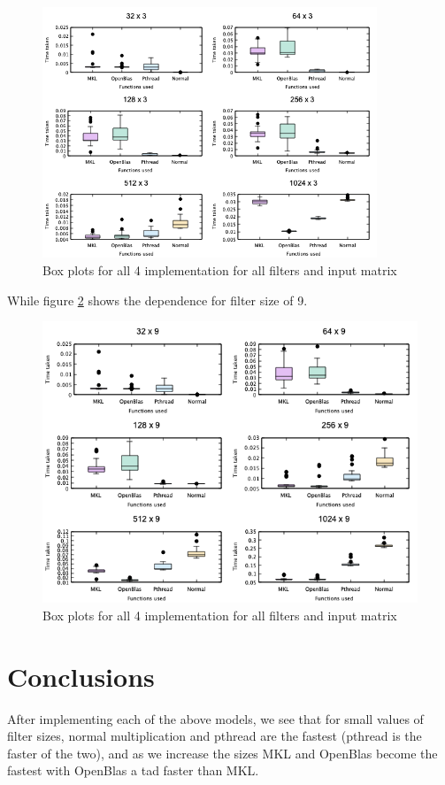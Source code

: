 \documentclass[a4paper]{article}
\begin{document}
\begin{figure}[!htbp]
\begin{center}
\includegraphics[width=10cm]{3filter.png}
\end{center}
\caption{Box plots for all 4 implementation for all filters and input matrix} \label{3filter}
\end{figure}


While figure \ref{9filter} shows the dependence for filter size of 9.

\begin{figure}[!htbp]
\begin{center}
\includegraphics[width=12cm]{9filter.png}
\end{center}
\caption{Box plots for all 4 implementation for all filters and input matrix} \label{9filter}
\end{figure}

\section{Conclusions}

After implementing each of the above models, we see that for small values of filter sizes, normal multiplication and pthread are the fastest (pthread is the faster of the two), and as we increase the sizes MKL and OpenBlas become the fastest with OpenBlas a tad faster than MKL.





\end{document}
